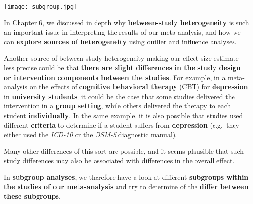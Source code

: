 \documentclass[]{book}
\begin{document}
\texttt{[image: subgroup.jpg]}

In \protect\hyperlink{heterogeneity}{Chapter 6}, we discussed in depth why \textbf{between-study heterogeneity} is such an important issue in interpreting the results of our meta-analysis, and how we can \textbf{explore sources of heterogeneity} using \protect\hyperlink{outliers}{outlier} and \protect\hyperlink{influenceanalyses}{influence analyses}.

Another source of between-study heterogeneity making our effect size estimate less precise could be that \textbf{there are slight differences in the study design or intervention components between the studies}. For example, in a meta-analysis on the effects of \textbf{cognitive behavioral therapy} (CBT) for \textbf{depression} in \textbf{university students}, it could be the case that some studies delivered the intervention in a \textbf{group setting}, while others delivered the therapy to each student \textbf{individually}. In the same example, it is also possible that studies used different \textbf{criteria} to determine if a student suffers from \textbf{depression} (e.g.~they either used the \emph{ICD-10} or the \emph{DSM-5} diagnostic manual).

Many other differences of this sort are possible, and it seems plausible that such study differences may also be associated with differences in the overall effect.

In \textbf{subgroup analyses}, we therefore have a look at different \textbf{subgroups within the studies of our meta-analysis} and try to determine of the \textbf{differ between these subgroups}.
\end{document}
